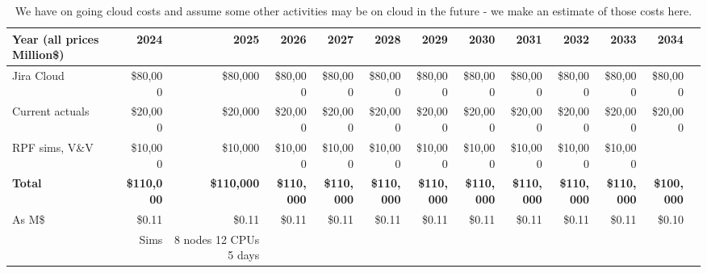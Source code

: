 \tiny \begin{longtable} { |p{}  |r  |r  |r  |r  |r  |r  |r  |r  |r  |r  |r  |r |} 
\caption{We have on going cloud costs and assume some other activities may be on cloud in the future - we make an estimate of those costs here. \label{tab:cloud}}\\ 
\hline 
\textbf{Year  (all prices Million\$)}&\textbf{2024}&\textbf{2025}&\textbf{2026}&\textbf{2027}&\textbf{2028}&\textbf{2029}&\textbf{2030}&\textbf{2031}&\textbf{2032}&\textbf{2033}&\textbf{2034} \\ \hline
{Jira Cloud}&{\$80,000}&{\$80,000}&{\$80,000}&{\$80,000}&{\$80,000}&{\$80,000}&{\$80,000}&{\$80,000}&{\$80,000}&{\$80,000}&{\$80,000} \\ \hline
{Current actuals}&{\$20,000}&{\$20,000}&{\$20,000}&{\$20,000}&{\$20,000}&{\$20,000}&{\$20,000}&{\$20,000}&{\$20,000}&{\$20,000}&{\$20,000} \\ \hline
{RPF sims, V\&V}&{\$10,000}&{\$10,000}&{\$10,000}&{\$10,000}&{\$10,000}&{\$10,000}&{\$10,000}&{\$10,000}&{\$10,000}&{\$10,000}& \\ \hline
\textbf{Total}&\textbf{\$110,000}&\textbf{\$110,000}&\textbf{\$110,000}&\textbf{\$110,000}&\textbf{\$110,000}&\textbf{\$110,000}&\textbf{\$110,000}&\textbf{\$110,000}&\textbf{\$110,000}&\textbf{\$110,000}&\textbf{\$100,000} \\ \hline
{As M\$}&{\$0.11}&{\$0.11}&{\$0.11}&{\$0.11}&{\$0.11}&{\$0.11}&{\$0.11}&{\$0.11}&{\$0.11}&{\$0.11}&{\$0.10} \\ \hline
{}&{Sims }&{8 nodes 12 CPUs 5 days}&&&&&&&&& \\ \hline
\end{longtable} \normalsize
